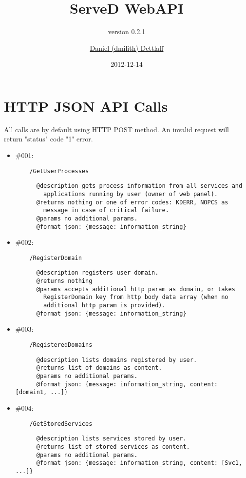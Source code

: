 \documentclass[11pt,a4paper]{scrartcl}
\title{ServeD WebAPI}
\subtitle{version 0.2.1}
\author{\href{mailto:dmilith@verknowsys.com}{Daniel (dmilith) Dettlaff}}
\date{2012-12-14}
\begin{document}
\maketitle

\section{HTTP JSON API Calls}\label{sec:apicalls}
  All calls are by default using HTTP POST method.
  An invalid request will return "status" code "1" error.

  \begin{itemize}

    \item \#001:
      \begin{verbatim}
    /GetUserProcesses
      \end{verbatim}
      \begin{verbatim}
      @description gets process information from all services and
        applications running by user (owner of web panel).
      @returns nothing or one of error codes: KDERR, NOPCS as
        message in case of critical failure.
      @params no additional params.
      @format json: {message: information_string}
      \end{verbatim}

    \item \#002:
      \begin{verbatim}
    /RegisterDomain
      \end{verbatim}
      \begin{verbatim}
      @description registers user domain.
      @returns nothing
      @params accepts additional http param as domain, or takes
        RegisterDomain key from http body data array (when no
        additional http param is provided).
      @format json: {message: information_string}
      \end{verbatim}

    \item \#003:
      \begin{verbatim}
    /RegisteredDomains
      \end{verbatim}
      \begin{verbatim}
      @description lists domains registered by user.
      @returns list of domains as content.
      @params no additional params.
      @format json: {message: information_string, content: [domain1, ...]}
      \end{verbatim}

    \item \#004:
      \begin{verbatim}
    /GetStoredServices
      \end{verbatim}
      \begin{verbatim}
      @description lists services stored by user.
      @returns list of stored services as content.
      @params no additional params.
      @format json: {message: information_string, content: [Svc1, ...]}
      \end{verbatim}


\end{itemize}
\end{document}
